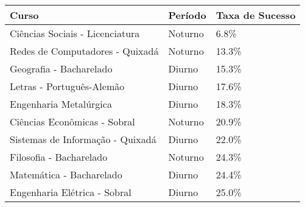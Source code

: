 \begin{tabular}{lll}
\toprule
                            Curso &  Período & Taxa de Sucesso \\
\midrule
  Ciências Sociais - Licenciatura &  Noturno &            6.8\% \\
  Redes de Computadores - Quixadá &  Noturno &           13.3\% \\
          Geografia - Bacharelado &   Diurno &           15.3\% \\
        Letras - Português-Alemão &   Diurno &           17.6\% \\
           Engenharia Metalúrgica &   Diurno &           18.3\% \\
     Ciências Econômicas - Sobral &  Noturno &           20.9\% \\
 Sistemas de Informação - Quixadá &   Diurno &           22.0\% \\
          Filosofia - Bacharelado &  Noturno &           24.3\% \\
         Matemática - Bacharelado &   Diurno &           24.4\% \\
     Engenharia Elétrica - Sobral &   Diurno &           25.0\% \\
\bottomrule
\end{tabular}
